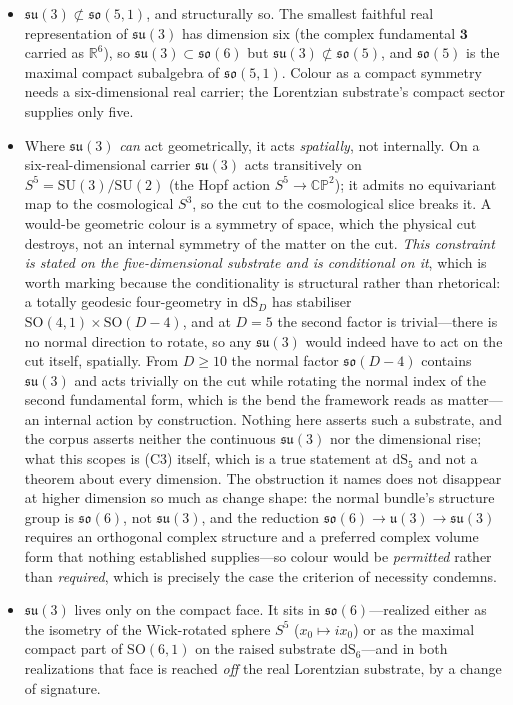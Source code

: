 \documentclass[11pt]{article}
\theoremstyle{plain}
\theoremstyle{remark}
\newcommand{\so}{\mathfrak{so}}
\newcommand{\su}{\mathfrak{su}}
\newcommand{\dS}{\mathrm{dS}}
\newcommand{\SO}{\mathrm{SO}}
\newcommand{\SU}{\mathrm{SU}}
\begin{document}
\begin{itemize}
\item[(C2)] $\su(3)\not\subset\so(5,1)$, and structurally so. The smallest faithful real representation of $\su(3)$ has dimension six (the complex fundamental $\mathbf{3}$ carried as $\mathbb{R}^6$), so $\su(3)\subset\so(6)$ but $\su(3)\not\subset\so(5)$, and $\so(5)$ is the maximal compact subalgebra of $\so(5,1)$. Colour as a compact symmetry needs a six-dimensional real carrier; the Lorentzian substrate's compact sector supplies only five.
\item[(C3)] Where $\su(3)$ \emph{can} act geometrically, it acts \emph{spatially}, not internally. On a six-real-dimensional carrier $\su(3)$ acts transitively on $S^5=\SU(3)/\SU(2)$ (the Hopf action $S^5\to\mathbb{CP}^2$); it admits no equivariant map to the cosmological $S^3$, so the cut to the cosmological slice breaks it. A would-be geometric colour is a symmetry of space, which the physical cut destroys, not an internal symmetry of the matter on the cut. \emph{This constraint is stated on the five-dimensional substrate and is conditional on it}, which is worth marking because the conditionality is structural rather than rhetorical: a totally geodesic four-geometry in $\dS_{D}$ has stabiliser $\SO(4,1)\times\SO(D-4)$, and at $D=5$ the second factor is trivial---there is no normal direction to rotate, so any $\su(3)$ would indeed have to act on the cut itself, spatially. From $D\ge10$ the normal factor $\so(D-4)$ contains $\su(3)$ and acts trivially on the cut while rotating the normal index of the second fundamental form, which is the bend the framework reads as matter---an internal action by construction. Nothing here asserts such a substrate, and the corpus asserts neither the continuous $\su(3)$ nor the dimensional rise; what this scopes is (C3) itself, which is a true statement at $\dS_5$ and not a theorem about every dimension. The obstruction it names does not disappear at higher dimension so much as change shape: the normal bundle's structure group is $\so(6)$, not $\su(3)$, and the reduction $\so(6)\to\mathfrak{u}(3)\to\su(3)$ requires an orthogonal complex structure and a preferred complex volume form that nothing established supplies---so colour would be \emph{permitted} rather than \emph{required}, which is precisely the case the criterion of necessity condemns.
\item[(C7)] $\su(3)$ lives only on the compact face. It sits in $\so(6)$---realized either as the isometry of the Wick-rotated sphere $S^5$ ($x_0\mapsto ix_0$) or as the maximal compact part of $\SO(6,1)$ on the raised substrate $\dS_6$---and in both realizations that face is reached \emph{off} the real Lorentzian substrate, by a change of signature.
\end{itemize}
\end{document}
